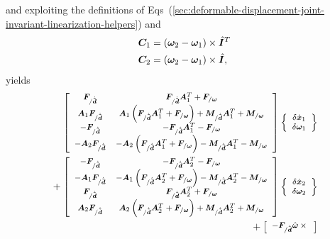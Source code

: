 \documentclass[10pt,dvips,fleqn,subeqn]{report}
\newcommand{\T}[1]{\bm{#1}}
\newcommand{\TT}[1]{\bm{#1}}
\begin{document}
and exploiting the definitions of
Eqs~(\ref{sec:deformable-displacement-joint-invariant-linearization-helpers})
and
\begin{subequations}
\begin{align}
	\TT{C}_1 &= \plbr{\T{\omega}_2 - \T{\omega}_1}\times\hat{\TT{I}}^T \\
	\TT{C}_2 &= \plbr{\T{\omega}_2 - \T{\omega}_1}\times\hat{\TT{I}}
	,
\end{align}
\end{subequations}
yields %
\begin{align}
	\footnotesize
	\sqbr{\matr{cc}{
		\T{F}_{/\dot{\tilde{\T{d}}}} 
		& \T{F}_{/\dot{\tilde{\T{d}}}} \TT{A}_1^T
			+ \T{F}_{/\T{\omega}}
		\\
%
		\TT{A}_1 \T{F}_{/\dot{\tilde{\T{d}}}} 
		& \TT{A}_1 \plbr{
			\T{F}_{/\dot{\tilde{\T{d}}}} \TT{A}_1^T
			+ \T{F}_{/\T{\omega}}
		}
			+ \T{M}_{/\dot{\tilde{\T{d}}}} \TT{A}_1^T
			+ \T{M}_{/\T{\omega}}
		\\
%
		- \T{F}_{/\dot{\tilde{\T{d}}}} 
		& - \T{F}_{/\dot{\tilde{\T{d}}}} \TT{A}_1^T
			- \T{F}_{/\T{\omega}}
		\\
%
		- \TT{A}_2 \T{F}_{/\dot{\tilde{\T{d}}}} 
		& - \TT{A}_2 \plbr{
			\T{F}_{/\dot{\tilde{\T{d}}}} \TT{A}_1^T
			+ \T{F}_{/\T{\omega}}
		}
			- \T{M}_{/\dot{\tilde{\T{d}}}} \TT{A}_1^T
			- \T{M}_{/\T{\omega}}
	}} \cubr{\cvvect{
		\delta\dot{\T{x}}_1 \\
		\delta\T{\omega}_1
	}} & \nonumber \\
	\footnotesize
	\mbox{} + \sqbr{\matr{cc}{
		- \T{F}_{/\dot{\tilde{\T{d}}}}
		& - \T{F}_{/\dot{\tilde{\T{d}}}} \TT{A}_2^T
			- \T{F}_{/\T{\omega}}
		\\
%
		- \TT{A}_1 \T{F}_{/\dot{\tilde{\T{d}}}}
		& - \TT{A}_1 \plbr{
			\T{F}_{/\dot{\tilde{\T{d}}}} \TT{A}_2^T
			+ \T{F}_{/\T{\omega}}
		}
			- \T{M}_{/\dot{\tilde{\T{d}}}} \TT{A}_2^T
			- \T{M}_{/\T{\omega}}
		\\
%
		\T{F}_{/\dot{\tilde{\T{d}}}}
		& \T{F}_{/\dot{\tilde{\T{d}}}} \TT{A}_2^T
			+ \T{F}_{/\T{\omega}}
		\\
%
		\TT{A}_2 \T{F}_{/\dot{\tilde{\T{d}}}}
		& \TT{A}_2 \plbr{
			\T{F}_{/\dot{\tilde{\T{d}}}} \TT{A}_2^T
			+ \T{F}_{/\T{\omega}}
		}
			+ \T{M}_{/\dot{\tilde{\T{d}}}} \TT{A}_2^T
			+ \T{M}_{/\T{\omega}}
	}} \cubr{\cvvect{
		\delta\dot{\T{x}}_2 \\
		\delta\T{\omega}_2
	}} & \nonumber \\
	\footnotesize
	\mbox{} + \sqbr{\matr{cc}{
		- \T{F}_{/\dot{\tilde{\T{d}}}} \hat{\T{\omega}}\times{}
}}
\end{align}
\end{document}
